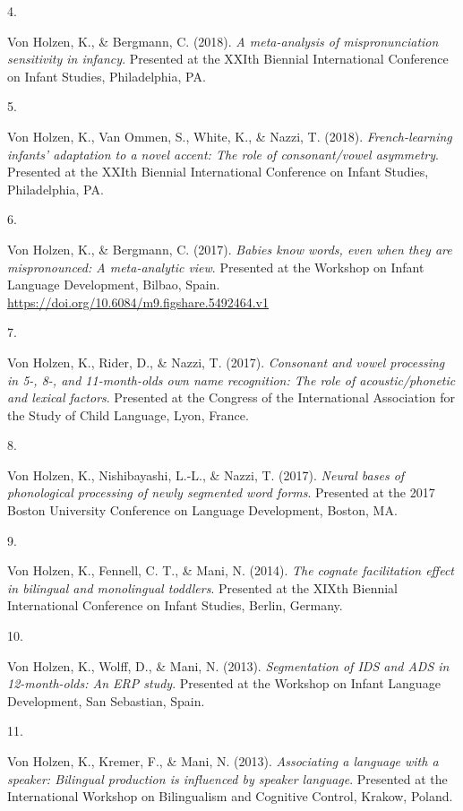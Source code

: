 \documentclass[10pt,a4paper,]{article}
\newlength{\cslhangindent}
\newlength{\csllabelwidth}
\newcommand{\CSLLeftMargin}[1]{\parbox[t]{\csllabelwidth}{\hfill #1~}}
\newcommand{\CSLRightInline}[1]{\parbox[t]{\linewidth - \cslhangindent - \csllabelwidth}{#1}\vspace{0.8ex}}
\begin{document}
\leavevmode{}%
\CSLLeftMargin{4. }%
\CSLRightInline{Von Holzen, K., \& Bergmann, C. (2018). \emph{A
meta-analysis of mispronunciation sensitivity in infancy}. Presented at
the XXIth Biennial International Conference on Infant Studies,
Philadelphia, PA.}

\leavevmode{}%
\CSLLeftMargin{5. }%
\CSLRightInline{Von Holzen, K., Van Ommen, S., White, K., \& Nazzi, T.
(2018). \emph{French-learning infants' adaptation to a novel accent: The
role of consonant/vowel asymmetry}. Presented at the XXIth Biennial
International Conference on Infant Studies, Philadelphia, PA.}

\leavevmode{}%
\CSLLeftMargin{6. }%
\CSLRightInline{Von Holzen, K., \& Bergmann, C. (2017). \emph{Babies
know words, even when they are mispronounced: A meta-analytic view}.
Presented at the Workshop on Infant Language Development, Bilbao, Spain.
\url{https://doi.org/10.6084/m9.figshare.5492464.v1}}

\leavevmode{}%
\CSLLeftMargin{7. }%
\CSLRightInline{Von Holzen, K., Rider, D., \& Nazzi, T. (2017).
\emph{Consonant and vowel processing in 5-, 8-, and 11-month-olds own
name recognition: The role of acoustic/phonetic and lexical factors}.
Presented at the Congress of the International Association for the Study
of Child Language, Lyon, France.}

\leavevmode{}%
\CSLLeftMargin{8. }%
\CSLRightInline{Von Holzen, K., Nishibayashi, L.-L., \& Nazzi, T.
(2017). \emph{Neural bases of phonological processing of newly segmented
word forms}. Presented at the 2017 Boston University Conference on
Language Development, Boston, MA.}

\leavevmode{}%
\CSLLeftMargin{9. }%
\CSLRightInline{Von Holzen, K., Fennell, C. T., \& Mani, N. (2014).
\emph{The cognate facilitation effect in bilingual and monolingual
toddlers}. Presented at the XIXth Biennial International Conference on
Infant Studies, Berlin, Germany.}

\leavevmode{}%
\CSLLeftMargin{10. }%
\CSLRightInline{Von Holzen, K., Wolff, D., \& Mani, N. (2013).
\emph{Segmentation of IDS and ADS in 12-month-olds: An ERP study}.
Presented at the Workshop on Infant Language Development, San Sebastian,
Spain.}

\leavevmode{}%
\CSLLeftMargin{11. }%
\CSLRightInline{Von Holzen, K., Kremer, F., \& Mani, N. (2013).
\emph{Associating a language with a speaker: Bilingual production is
influenced by speaker language}. Presented at the International Workshop
on Bilingualism and Cognitive Control, Krakow, Poland.}
\end{document}
